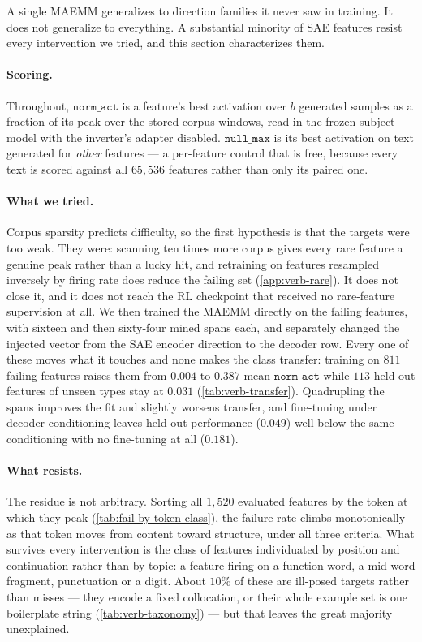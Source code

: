 
A single MAEMM generalizes to direction families it never saw in training. It does not generalize
to everything. A substantial minority of SAE features resist every intervention we tried, and this
section characterizes them.

\paragraph{Scoring.} Throughout, $\texttt{norm\_act}$ is a feature's best activation over $b$
generated samples as a fraction of its peak over the stored corpus windows, read in the frozen
subject model with the inverter's adapter disabled. $\texttt{null\_max}$ is its best activation on
text generated for \emph{other} features --- a per-feature control that is free, because every text
is scored against all $65{,}536$ features rather than only its paired one.

\paragraph{What we tried.}
Corpus sparsity predicts difficulty, so the first hypothesis is that the targets were too weak. They
were: scanning ten times more corpus gives every rare feature a genuine peak rather than a lucky
hit, and retraining on features resampled inversely by firing rate does reduce the failing set
(\cref{app:verb-rare}). It does not close it, and it does not reach the RL checkpoint that received
no rare-feature supervision at all. We then trained the MAEMM directly on the failing features, with
sixteen and then sixty-four mined spans each, and separately changed the injected vector from the
SAE encoder direction to the decoder row. Every one of these moves what it touches and none makes
the class transfer: training on $811$ failing features raises them from $0.004$ to $0.387$ mean
$\texttt{norm\_act}$ while $113$ held-out features of unseen types stay at $0.031$
(\cref{tab:verb-transfer}). Quadrupling the spans improves the fit and slightly worsens transfer,
and fine-tuning under decoder conditioning leaves held-out performance ($0.049$) well below the
same conditioning with no fine-tuning at all ($0.181$).

\paragraph{What resists.}
The residue is not arbitrary. Sorting all $1{,}520$ evaluated features by the token at which they
peak (\cref{tab:fail-by-token-class}), the failure rate climbs monotonically as that token moves from
content toward structure, under all three criteria. What survives every intervention is the class of
features individuated by position and continuation rather than by topic: a feature firing on a
function word, a mid-word fragment, punctuation or a digit. About $10\%$ of these are ill-posed
targets rather than misses --- they encode a fixed collocation, or their whole example set is one
boilerplate string (\cref{tab:verb-taxonomy}) --- but that leaves the great majority unexplained.


